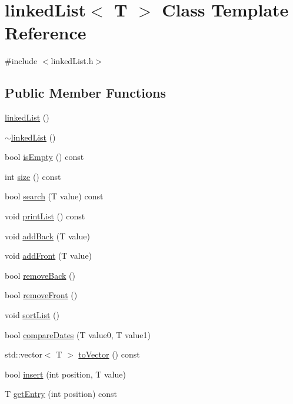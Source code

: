 \hypertarget{classlinked_list}{}\section{linked\+List$<$ T $>$ Class Template Reference}
\label{classlinked_list}


{\ttfamily \#include $<$linked\+List.\+h$>$}

\subsection*{Public Member Functions}
\begin{DoxyCompactItemize}
\item 
\hyperlink{classlinked_list_a63f463149258669636253a7977157c9c}{linked\+List} ()
\item 
\hyperlink{classlinked_list_ab1a1db35879ca07c40b68ccb2b05d150}{$\sim$linked\+List} ()
\item 
bool \hyperlink{classlinked_list_a50bf51fe7736a2dcb925a6959b7d9b16}{is\+Empty} () const
\item 
int \hyperlink{classlinked_list_a8e4c7120a78d276a617f20e06f657fb1}{size} () const
\item 
bool \hyperlink{classlinked_list_a5b5b1d9157fc0a5832d7b4889ff96d46}{search} (T value) const
\item 
void \hyperlink{classlinked_list_ab2352d0baa1972fc01643a5ff27fe0ae}{print\+List} () const
\item 
void \hyperlink{classlinked_list_a228718a0b785bd1f8b987962774f177f}{add\+Back} (T value)
\item 
void \hyperlink{classlinked_list_af96d3e766bbd2f1c62edc49fb1c66fc6}{add\+Front} (T value)
\item 
bool \hyperlink{classlinked_list_a4c07d7c746d1aa4edc9d75b1e45987e9}{remove\+Back} ()
\item 
bool \hyperlink{classlinked_list_a950409c8ae9d09a1d930f5d9f1b84a23}{remove\+Front} ()
\item 
void \hyperlink{classlinked_list_addb0fd9389aa4a6e814c230b49713110}{sort\+List} ()
\item 
bool \hyperlink{classlinked_list_a011f58721a9d41f5cac88ed761855871}{compare\+Dates} (T value0, T value1)
\item 
std\+::vector$<$ T $>$ \hyperlink{classlinked_list_ac520d6ebd99194ed4589245bfb332903}{to\+Vector} () const
\item 
bool \hyperlink{classlinked_list_aa18ea45a38e5593b8adc1e79029b3977}{insert} (int position, T value)
\item 
T \hyperlink{classlinked_list_a612ab14fb37fa98281b3e8cf916f41c6}{get\+Entry} (int position) const
\end{DoxyCompactItemize}


